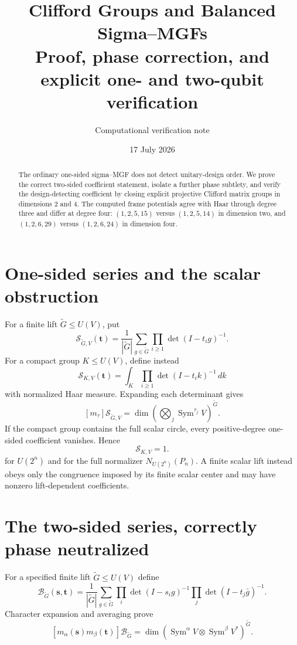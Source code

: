 \documentclass[11pt]{article}
\title{\color{navy}\bfseries Clifford Groups and Balanced Sigma--MGFs\\
\large Proof, phase correction, and explicit one- and two-qubit verification}
\author{Computational verification note}\date{17 July 2026}
\newcommand{\Sgm}{\mathcal S}\newcommand{\Bmgf}{\mathcal B}
\begin{document}
\maketitle

\begin{abstract}
The ordinary one-sided sigma--MGF does not detect unitary-design order.  We
prove the correct two-sided coefficient statement, isolate a further phase
subtlety, and verify the design-detecting coefficient by closing explicit
projective Clifford matrix groups in dimensions $2$ and $4$.  The computed
frame potentials agree with Haar through degree three and differ at degree
four: $(1,2,5,15)$ versus $(1,2,5,14)$ in dimension two, and
$(1,2,6,29)$ versus $(1,2,6,24)$ in dimension four.
\end{abstract}

\section{One-sided series and the scalar obstruction}
For a finite lift $\widetilde G\leq U(V)$, put
\[
\Sgm_{\widetilde G,V}(\mathbf t)=\frac1{|\widetilde G|}\sum_{g\in\widetilde G}
 \prod_{i\geq1}\det(I-t_i g)^{-1}.
\]
For a compact group $K\leq U(V)$, define instead
\[
\Sgm_{K,V}(\mathbf t)=\int_K\prod_{i\geq1}\det(I-t_i k)^{-1}\,dk
\]
with normalized Haar measure.
Expanding each determinant gives
\[
[m_\tau]\Sgm_{\widetilde G,V}=\dim\left(\bigotimes_j
\operatorname{Sym}^{\tau_j}V\right)^{\widetilde G}.
\]
If the compact group contains the full scalar circle, every positive-degree
one-sided coefficient vanishes.  Hence
\[
\boxed{\Sgm_{K,V}=1.}
\]
for $U(2^n)$ and for the full normalizer $N_{U(2^n)}(P_n)$.  A finite scalar
lift instead obeys only the congruence imposed by its finite scalar center and
may have nonzero lift-dependent coefficients.

\section{The two-sided series, correctly phase neutralized}
For a specified finite lift $\widetilde G\leq U(V)$ define
\[
\Bmgf_{\widetilde G}(\mathbf s,\mathbf t)
=\frac1{|\widetilde G|}\sum_{g\in\widetilde G}
 \prod_i\det(I-s_i g)^{-1}\prod_j\det(I-t_j\bar g)^{-1}.
\]
Character expansion and averaging prove
\begin{equation}\label{eq:two-sided}
[m_\alpha(\mathbf s)m_\beta(\mathbf t)]\Bmgf_{\widetilde G}
=\dim\left(\operatorname{Sym}^{\alpha}V\otimes
\operatorname{Sym}^{\beta}V^*\right)^{\widetilde G}.
\end{equation}
\end{document}
